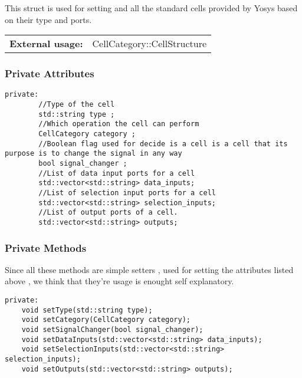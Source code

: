 \documentclass{article}
\begin{document}
This struct is used for setting and all the standard cells provided by Yosys based on their type and ports.\\

\begin{tabular}{ll}
	\textbf{External usage: } & CellCategory::CellStructure\\
\end{tabular}

\subsubsection{Private Attributes}

\begin{mdframed}[hidealllines=true, backgroundcolor=magenta!10]
	\begin{lstlisting}[basicstyle=\tiny]
	private:
		//Type of the cell
		std::string type ;
		//Which operation the cell can perform
		CellCategory category ;
		//Boolean flag used for decide is a cell is a cell that its purpose is to change the signal in any way
		bool signal_changer ;
		//List of data input ports for a cell
		std::vector<std::string> data_inputs;
		//List of selection input ports for a cell
		std::vector<std::string> selection_inputs;
		//List of output ports of a cell.
		std::vector<std::string> outputs; 
	\end{lstlisting}
\end{mdframed}

\subsubsection{Private Methods}

Since all these methods are simple setters , used for setting the attributes listed above , we think that they're usage is enought self explanatory.\\

\begin{mdframed}[hidealllines=true, backgroundcolor=magenta!10]
	\begin{lstlisting}[basicstyle=\tiny]
private:
	void setType(std::string type);
	void setCategory(CellCategory category);
	void setSignalChanger(bool signal_changer);
	void setDataInputs(std::vector<std::string> data_inputs);
	void setSelectionInputs(std::vector<std::string> selection_inputs);
	void setOutputs(std::vector<std::string> outputs);
	\end{lstlisting}
\end{mdframed}
\end{document}
